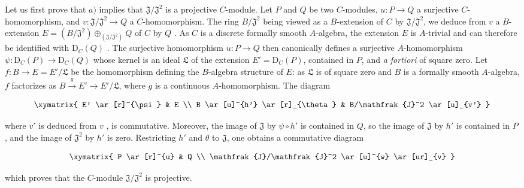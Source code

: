 \begin{env}[19.5.4.1]
\label{0.19.5.4.1}
Let us first prove that $a)$ implies that $\mathfrak{J}/\mathfrak{J}^2$ is a projective $C$-module.
Let $P$ and $Q$ be two $C$-modules, $u:P\to Q$ a surjective $C$-homomorphism, and $v:\mathfrak{J}/\mathfrak{J}^2\to Q$ a $C$-homomorphism.
The ring $B/\mathfrak{J}^2$ being viewed as a $B$-extension of $C$ by $\mathfrak{J}/\mathfrak{J}^2$, we deduce from $v$ a $B$-extension $E=(B/\mathfrak{J}^2)\oplus_{(\mathfrak{J}/\mathfrak{J}^2)}Q$ of $C$ by $Q$ .
As $C$ is a discrete formally smooth $A$-algebra, the extension $E$ is $A$-trivial  and can therefore be identified with $\mathrm{D}_C(Q)$ .
The surjective homomorphism $u:P\to Q$ then canonically defines a surjective $A$-homomorphism $\psi:\mathrm{D}_C(P)\to\mathrm{D}_C(Q)$  whose kernel is an ideal $\mathfrak{L}$ of the extension $E'=\mathrm{D}_C(P)$, contained in $P$, and \emph{a fortiori} of square zero.
Let $f:B\to E=E'/\mathfrak{L}$ be the homomorphism defining the $B$-algebra structure of $E$: as $\mathfrak{L}$ is of square zero and $B$ is a formally smooth $A$-algebra,
$f$ factorizes as $B\xrightarrow{g}E'\to E'/\mathfrak{L}$, where $g$ is a continuous $A$-homomorphism.
The diagram

\[
\xymatrix{
    E' \ar[r]^{\psi} & E \\
    B \ar[u]^{h'} \ar[r]_{\theta} & B/\mathfrak{J}^2 \ar[u]_{v'}
  }
\]

where $v'$ is deduced from $v$ , is commutative.
Moreover, the image of $\mathfrak{J}$ by $\psi\circ h'$ is contained in $Q$, so the image of $\mathfrak{J}$ by $h'$ is contained in $P$, and the image of $\mathfrak{J}^2$ by $h'$ is zero.
Restricting $h'$ and $\theta$ to $\mathfrak{J}$, one obtains a commutative diagram

\[
\xymatrix{
    P \ar[r]^{u} & Q \\
    \mathfrak{J}/\mathfrak{J}^2 \ar[u]^{w} \ar[ur]_{v}
  }
\]

which proves that the $C$-module $\mathfrak{J}/\mathfrak{J}^2$ is projective.
\end{env}

